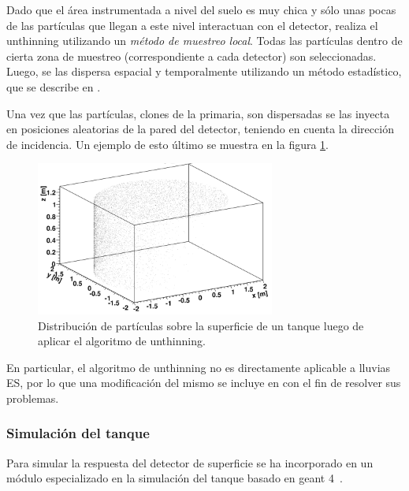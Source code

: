 		Dado que el \'area instrumentada a nivel del suelo es muy chica y s\'olo unas pocas de las part\'iculas que llegan a este nivel interactuan con el detector,
		\Offline{} realiza el unthinning utilizando un \textit{m\'etodo de muestreo local}.
		Todas las part\'iculas dentro de cierta zona de muestreo (correspondiente a cada detector) son seleccionadas.
		Luego, se las dispersa espacial y temporalmente utilizando un m\'etodo estad\'istico, que se describe en \cite{unthinning1}.
		
		Una vez que las part\'iculas, clones de la primaria, son dispersadas se las inyecta en posiciones aleatorias de la pared del detector, teniendo en cuenta la direcci\'on de incidencia. 
		Un ejemplo de esto \'ultimo se muestra en la figura \ref{fig:unthinning_tank}.
		\begin{figure}[h!]
			\begin{center}
			\includegraphics[width=0.7\textwidth]{fig/simulacionAuger/unthinning_tank}
			\caption{Distribuci\'on de part\'iculas sobre la superficie de un tanque luego de aplicar el algoritmo de unthinning.}
			\label{fig:unthinning_tank}
			\end{center}
		\end{figure}
		
		En particular, el algoritmo de unthinning no es directamente aplicable a lluvias ES, por lo que una modificaci\'on del mismo se incluye en \Offline{} con el fin de resolver sus problemas.
		
		
		\subsubsection{Simulaci\'on del tanque}
		
		Para simular la respuesta del detector de superficie se ha incorporado en \Offline{} un m\'odulo especializado en la simulaci\'on del tanque basado en {\sc geant 4}~\cite{geant4}.
		
